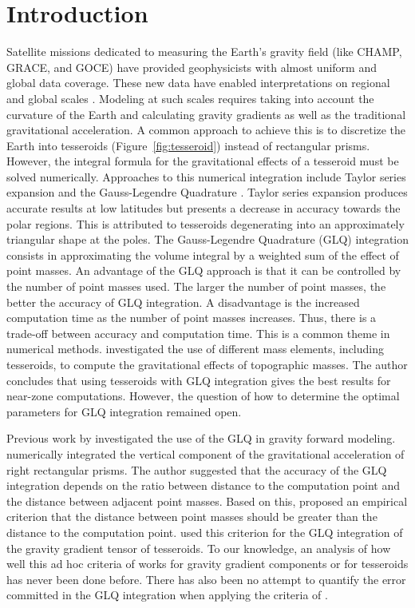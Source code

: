 \documentclass[manuscript,endfloat]{geophysics}
\begin{document}
\section{Introduction}


Satellite missions dedicated to measuring the Earth's gravity field
(like CHAMP, GRACE, and GOCE)
have provided geophysicists with almost uniform and global data coverage.
These new data have enabled interpretations on regional and global scales
\citep[e.g.][]{Reguzzoni2013,Braitenberg2015}.
Modeling at such scales requires taking into account the curvature of the
Earth and calculating gravity gradients as well as the traditional
gravitational acceleration.
A common approach to achieve this is
to discretize the Earth into tesseroids (Figure~\ref{fig:tesseroid})
instead of rectangular prisms.
However, the integral formula for the gravitational effects of a tesseroid
must be solved numerically.
Approaches to this numerical integration include
Taylor series expansion \citep{Heck2007, Grombein2013}
and the Gauss-Legendre Quadrature \citep{Asgharzadeh2007}.
Taylor series expansion produces accurate results at low latitudes but
presents a decrease in accuracy towards the polar regions.
This is attributed to tesseroids degenerating into an approximately triangular
shape at the poles.
The Gauss-Legendre Quadrature (GLQ) integration consists in approximating
the volume integral by a weighted sum of the effect of point masses.
An advantage of the GLQ approach is that it can be
controlled by the number of point masses used.
The larger the number of point masses,
the better the accuracy of GLQ integration.
A disadvantage is the increased computation time as the number of
point masses increases.
Thus, there is a trade-off between accuracy and computation time.
This is a common theme in numerical methods.
\citet{Wild-Pfeiffer2008} investigated the use of different mass elements,
including tesseroids, to compute the gravitational effects of topographic
masses.
The author concludes that using tesseroids with GLQ integration gives the best
results for near-zone computations.
However, the question of how to determine the optimal parameters for GLQ
integration remained open.


Previous work by \citet{Ku1977} investigated the use of the GLQ
in gravity forward modeling.
\citet{Ku1977} numerically integrated the vertical component of the
gravitational acceleration of right rectangular prisms.
The author suggested that the accuracy of the GLQ integration depends on
the ratio between distance to the computation point and the distance between
adjacent point masses.
Based on this, \citet{Ku1977} proposed an empirical criterion that
the distance between point masses should be greater than
the distance to the computation point.
\citet{Asgharzadeh2007} used  this criterion for the GLQ integration of
the gravity gradient tensor of tesseroids.
To our knowledge, an analysis of how well this ad hoc criteria of
\citet{Ku1977} works for gravity gradient components or for tesseroids
has never been done before.
There has also been no attempt to quantify the error committed in the GLQ
integration when applying the criteria of \citet{Ku1977}.
\end{document}
